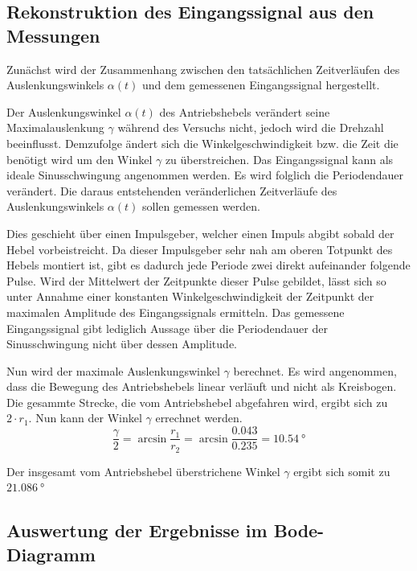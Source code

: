 \documentclass[a4paper,12pt]{scrartcl}
\begin{document}
\subsection{Rekonstruktion des Eingangssignal aus den Messungen}

Zunächst wird der Zusammenhang zwischen den tatsächlichen Zeitverläufen des Auslenkungswinkels $\alpha \left( t \right)$ und dem gemessenen Eingangssignal hergestellt.

Der Auslenkungswinkel $\alpha \left( t \right)$ des Antriebshebels verändert seine Maximalauslenkung $\gamma$ während des Versuchs nicht, jedoch wird die Drehzahl beeinflusst.
Demzufolge ändert sich die Winkelgeschwindigkeit bzw. die Zeit die benötigt wird um den Winkel $\gamma$ zu überstreichen.
Das Eingangssignal kann als ideale Sinusschwingung angenommen werden.
Es wird folglich die Periodendauer verändert. Die daraus entstehenden veränderlichen Zeitverläufe des Auslenkungswinkels $\alpha \left( t \right)$ sollen gemessen werden.

Dies geschieht über einen Impulsgeber, welcher einen Impuls abgibt sobald der Hebel vorbeistreicht.
Da dieser Impulsgeber sehr nah am oberen Totpunkt des Hebels montiert ist, gibt es dadurch jede Periode zwei direkt aufeinander folgende Pulse.
Wird der Mittelwert der Zeitpunkte dieser Pulse gebildet, lässt sich so unter Annahme einer konstanten Winkelgeschwindigkeit der Zeitpunkt der maximalen Amplitude des Eingangssignals ermitteln.
Das gemessene Eingangssignal gibt lediglich Aussage über die Periodendauer der Sinusschwingung nicht über dessen Amplitude.


Nun wird der maximale Auslenkungswinkel $\gamma$ berechnet. Es wird angenommen, dass die Bewegung des Antriebshebels linear verläuft und nicht als Kreisbogen.
Die gesammte Strecke, die vom Antriebshebel abgefahren wird, ergibt sich zu $2 \cdot r_1$. Nun kann der Winkel $\gamma$ errechnet werden.
\begin{equation}
	\frac{\gamma}{2} = \arcsin{\frac{r_1}{r_2}} = \arcsin{\frac{0.043}{0.235}} =  \SI{10.54}{\degree}
\end{equation}

Der insgesamt vom Antriebshebel überstrichene Winkel $\gamma$ ergibt sich somit zu $\SI{21.086}{\degree}$

\subsection{Auswertung der Ergebnisse im Bode-Diagramm}
\end{document}
